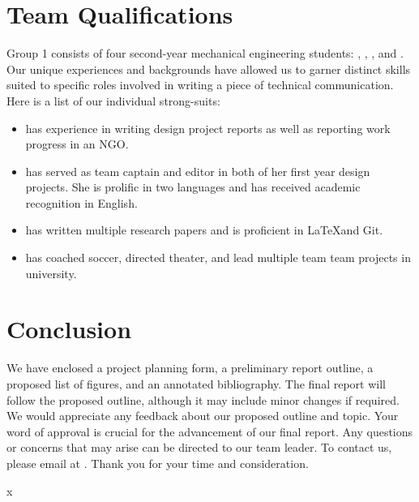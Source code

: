 \documentclass[letterpaper,11pt]{memo} %
\begin{document}
\pagebreak
\section{Team Qualifications}
Group 1 consists of four second-year mechanical engineering students: \protect{}, \protect{}, \protect{}, and \protect{}. 
Our unique experiences and backgrounds have allowed us to garner distinct skills suited to specific roles involved in writing a piece of technical communication. 
Here is a list of our individual strong-suits: 
\begin{itemize}
	\item {} has experience in writing design project reports as well as reporting work progress in an NGO.
	\item {} has served as team captain  and editor in both of her first year design projects. 
	She is prolific in two languages and has received academic recognition in English. 
	\item {} has written multiple research papers and is proficient in \LaTeX \space and Git.
	\item {} has coached soccer, directed theater, and lead multiple team team projects in university. 
\end{itemize}

\section{Conclusion}
We have enclosed a project planning form, a preliminary report outline, a proposed list of figures, and an annotated bibliography.
The final report will follow the proposed outline, although it may include minor changes if required. 
We would appreciate any feedback about our proposed outline and topic. 
Your word of approval is crucial for the advancement of our final report. 
Any questions or concerns that may arise can be directed to our team leader. 
To contact us, please email  at . 
Thank you for your time and consideration.

\vspace{5mm}

\listofenclosure

\pagebreak


\phantom x



\end{document}

